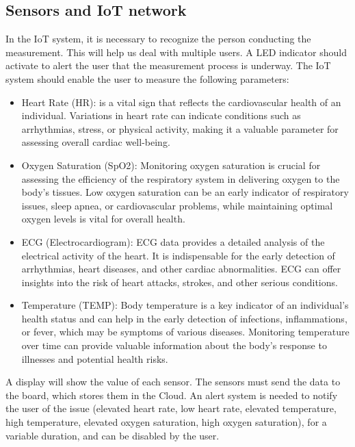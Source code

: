 \documentclass[12pt]{article}
\begin{document}
\subsection{Sensors and IoT network}
In the IoT system, it is necessary to recognize the person conducting the measurement. This will help us deal with multiple users. A LED indicator should activate to alert the user that the measurement process is underway. The IoT system should enable the user to measure the following parameters:
\begin{itemize}
    \item Heart Rate (HR): is a vital sign that reflects the cardiovascular health of an individual. Variations in heart rate can indicate conditions such as arrhythmias, stress, or physical activity, making it a valuable parameter for assessing overall cardiac well-being. 
    \item Oxygen Saturation (SpO2): Monitoring oxygen saturation is crucial for assessing the efficiency of the respiratory system in delivering oxygen to the body's tissues. Low oxygen saturation can be an early indicator of respiratory issues, sleep apnea, or cardiovascular problems, while maintaining optimal oxygen levels is vital for overall health.
    \item ECG (Electrocardiogram): ECG data provides a detailed analysis of the electrical activity of the heart. It is indispensable for the early detection of arrhythmias, heart diseases, and other cardiac abnormalities. ECG can offer insights into the risk of heart attacks, strokes, and other serious conditions.
    \item Temperature (TEMP): Body temperature is a key indicator of an individual's health status and can help in the early detection of infections, inflammations, or fever, which may be symptoms of various diseases. Monitoring temperature over time can provide valuable information about the body's response to illnesses and potential health risks.
\end{itemize}
A display will show the value of each sensor. The sensors must send the data to the board, which stores them in the Cloud. An alert system is needed to notify the user of the issue (elevated heart rate, low heart rate, elevated temperature, high temperature, elevated oxygen saturation, high oxygen saturation), for a variable duration, and can be disabled by the user.
\end{document}
